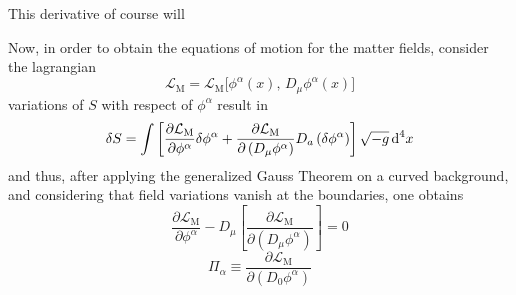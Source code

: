 This derivative of course will 


Now, in order to obtain the equations of motion for the matter fields, consider the lagrangian
\begin{equation}
	\mathcal{L}_{\text{M}}=\mathcal{L}_{\text{M}}\big[\phi^\alpha(x),\,D_\mu\phi^\alpha(x)\big]
\end{equation}
variations of $S$ with respect of $\phi^\alpha$ result in
\begin{equation}
	\delta S=\int\left[\frac{\partial \mathcal{L}_\text{M}}{\partial \phi^\alpha}\delta\phi^\alpha+\frac{\partial \mathcal{L}_\text{M}}{\partial\left(D_\mu\phi^\alpha\right)}D_a\left(\delta\phi^\alpha\right)\right]\sqrt{-g}\,\text{d}^4x
\end{equation}
and thus, after applying the generalized Gauss Theorem on a curved background, and considering that field variations vanish at the boundaries, one obtains
\begin{equation}
	\frac{\partial \mathcal{L}_\text{M}}{\partial \phi^\alpha}-D_\mu\left[\frac{\partial \mathcal{L}_\text{M}}{\partial\left(D_\mu\phi^\alpha\right)}\right]=0
\end{equation}
\begin{equation}
	\Pi_\alpha\equiv \frac{\partial\mathcal{L}_\text{M}}{\partial\left(D_0\phi^\alpha\right)}
\end{equation}
